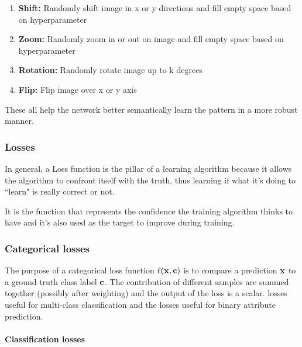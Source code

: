 \begin{enumerate}
	\item \textbf{Shift:} Randomly shift image in x or y directions and fill empty space based on hyperparameter
	\item \textbf{Zoom:} Randomly zoom in or out on image and fill empty space based on hyperparameter
	\item \textbf{Rotation:} Randomly rotate image up to k degrees
	\item \textbf{Flip:} Flip image over x or y axis
\end{enumerate}

These all help the network better semantically learn the pattern in a more robust manner.

\subsubsection{Losses}\label{s:losses}

In general, a Loss function is the pillar of a learning algorithm because it allows the algorithm to confront itself with the truth, thus learning if what it's doing to “learn" is really correct or not.

It is the function that represents the confidence the training algorithm thinks to have and it's also used as the target to improve during training.


\subsubsection{Categorical losses}\label{s:catlosses}

The purpose of a categorical loss function $\ell(\mathbf{x},\mathbf{c})$ is to compare a prediction $\mathbf{x}$ to a ground truth class label $\mathbf{c}$. The contribution of different samples are summed together (possibly after weighting) and the output of the loss is a scalar.  losses useful for multi-class classification and the  losses useful for binary attribute prediction. 

\paragraph{Classification losses}\label{s:loss-classification}

